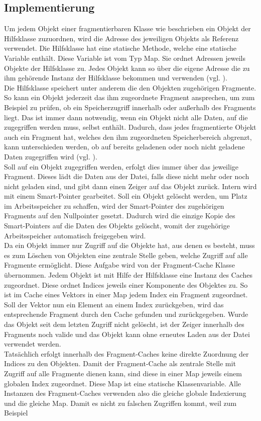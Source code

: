\subsection{Implementierung}
    Um jedem Objekt einer fragmentierbaren Klasse wie beschrieben ein Objekt der Hilfsklasse zuzuordnen, wird die Adresse des jeweiligen Objekts als Referenz verwendet. Die Hilfsklasse hat eine statische Methode, welche eine statische Variable enthält. Diese Variable ist vom Typ Map. Sie ordnet Adressen jeweils Objekte der Hilfsklasse zu. Jedes Objekt kann so über die eigene Adresse die zu ihm gehörende Instanz der Hilfsklasse bekommen und verwenden (vgl. ).\\ Die Hilfsklasse speichert unter anderem die den Objekten zugehörigen Fragmente. So kann ein Objekt jederzeit das ihm zugeordnete Fragment ansprechen, um zum Beispiel zu prüfen, ob ein Speicherzugriff innerhalb oder außerhalb des Fragments liegt. Das ist immer dann notwendig, wenn ein Objekt nicht alle Daten, auf die zugegriffen werden muss, selbst enthält. Dadurch, dass jedes fragmentierte Objekt auch ein Fragment hat, welches den ihm zugeordneten Speicherbereich abgrenzt, kann unterschieden werden, ob auf bereits geladenen oder noch nicht geladene Daten zugegriffen wird (vgl. ).\\ Soll auf ein Objekt zugegriffen werden, erfolgt dies immer über das jeweilige Fragment. Dieses lädt die Daten aus der Datei, falls diese nicht mehr oder noch nicht geladen sind, und gibt dann einen Zeiger auf das Objekt zurück. Intern wird mit einem Smart-Pointer gearbeitet. Soll ein Objekt gelöscht werden, um Platz im Arbeitsspeicher zu schaffen, wird der Smart-Pointer des zugehörigen Fragments auf den Nullpointer gesetzt. Dadurch wird die einzige Kopie des Smart-Pointers auf die Daten des Objekts gelöscht, womit der zugehörige Arbeitsspeicher automatisch freigegeben wird.\\ Da ein Objekt immer nur Zugriff auf die Objekte hat, aus denen es besteht, muss es zum Löschen von Objekten eine zentrale Stelle geben, welche Zugriff auf alle Fragmente ermöglicht. Diese Aufgabe wird von der Fragment-Cache Klasse übernommen. Jedem Objekt ist mit Hilfe der Hilfsklasse eine Instanz des Caches zugeordnet. Diese ordnet Indices jeweils einer Komponente des Objektes zu. So ist im Cache eines Vektors in einer Map jedem Index ein Fragment zugeordnet. Soll der Vektor nun ein Element an einem Index zurückgeben, wird das entsprechende Fragment durch den Cache gefunden und zurückgegeben. Wurde das Objekt seit dem letzten Zugriff nicht gelöscht, ist der Zeiger innerhalb des Fragments noch valide und das Objekt kann ohne erneutes Laden aus der Datei verwendet werden.\\ Tatsächlich erfolgt innerhalb des Fragment-Caches keine direkte Zuordnung der Indices zu den Objekten. Damit der Fragment-Cache als zentrale Stelle mit Zugriff auf alle Fragmente dienen kann, sind diese in einer Map jeweils einem globalen Index zugeordnet. Diese Map ist eine statische Klassenvariable. Alle Instanzen des Fragment-Caches verwenden also die gleiche globale Indexierung und die gleiche Map. Damit es nicht zu falschen Zugriffen kommt, weil zum Beispiel 